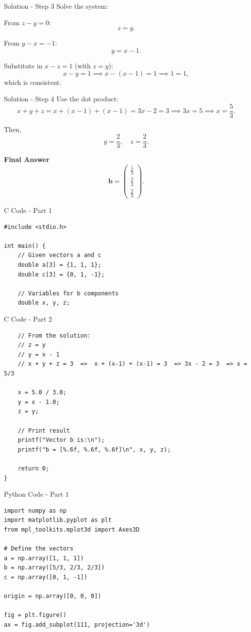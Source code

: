 \documentclass{beamer}
\begin{document}
\begin{frame}{Solution - Step 3}
Solve the system:

From \(z - y = 0\):
\[
z = y.
\]

From \(y - x = -1\):
\[
y = x - 1.
\]

Substitute in \(x - z = 1\) (with \(z=y\)):
\[
x - y = 1 \implies x - (x - 1) = 1 \implies 1 = 1,
\]
which is consistent.
\end{frame}

\begin{frame}{Solution - Step 4}
Use the dot product:
\[
x + y + z = x + (x - 1) + (x - 1) = 3x - 2 = 3 \implies 3x = 5 \implies x = \frac{5}{3}.
\]

Then,
\[
y = \frac{2}{3}, \quad z = \frac{2}{3}.
\]


\textbf{Final Answer}
\[
\boxed{
\mathbf{b} = \begin{pmatrix} \frac{5}{3} \\[6pt] \frac{2}{3} \\[6pt] \frac{2}{3} \end{pmatrix}.
}
\]
\end{frame}

\begin{frame}[fragile]{C Code - Part 1}
\begin{verbatim}
#include <stdio.h>

int main() {
    // Given vectors a and c
    double a[3] = {1, 1, 1};
    double c[3] = {0, 1, -1};

    // Variables for b components
    double x, y, z;
\end{verbatim}
\end{frame}

\begin{frame}[fragile]{C Code - Part 2}
\begin{verbatim}
    // From the solution:
    // z = y
    // y = x - 1
    // x + y + z = 3  =>  x + (x-1) + (x-1) = 3  => 3x - 2 = 3  => x = 5/3

    x = 5.0 / 3.0;
    y = x - 1.0;
    z = y;

    // Print result
    printf("Vector b is:\n");
    printf("b = [%.6f, %.6f, %.6f]\n", x, y, z);

    return 0;
}
\end{verbatim}
\end{frame}

\begin{frame}[fragile]{Python Code - Part 1}
\begin{verbatim}
import numpy as np
import matplotlib.pyplot as plt
from mpl_toolkits.mplot3d import Axes3D

# Define the vectors
a = np.array([1, 1, 1])
b = np.array([5/3, 2/3, 2/3])
c = np.array([0, 1, -1])

origin = np.array([0, 0, 0])

fig = plt.figure()
ax = fig.add_subplot(111, projection='3d')
\end{verbatim}
\end{frame}
\end{document}
